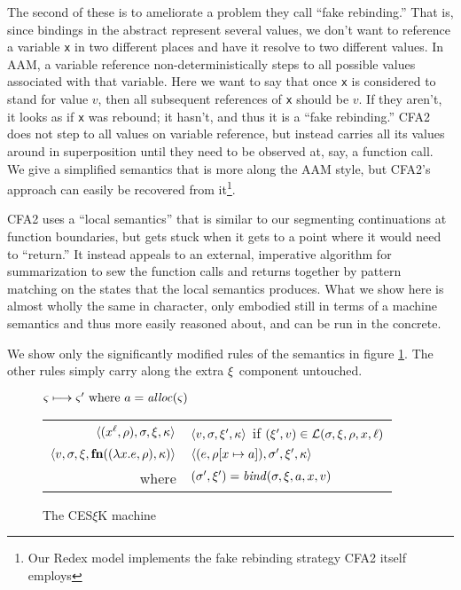 \documentclass{llncs}
\begin{document}
The second of these is to ameliorate a problem they call ``fake
rebinding.'' That is, since bindings in the abstract represent several
values, we don't want to reference a variable \texttt{x} in two
different places and have it resolve to two different values. In AAM,
a variable reference non-deterministically steps to all possible
values associated with that variable. Here we want to say that once
\texttt{x} is considered to stand for value $v$, then all subsequent
references of \texttt{x} should be $v$. If they aren't, it looks as if
\texttt{x} was rebound; it hasn't, and thus it is a ``fake
rebinding.'' CFA2 does not step to all values on variable reference,
but instead carries all its values around in superposition until they
need to be observed at, say, a function call. We give a simplified
semantics that is more along the AAM style, but CFA2's approach can
easily be recovered from it\footnote{Our Redex model implements the
  fake rebinding strategy CFA2 itself employs}.

CFA2 uses a ``local semantics'' that is similar to our segmenting
continuations at function boundaries, but gets stuck when it gets to a
point where it would need to ``return.'' It instead appeals to an
external, imperative algorithm for summarization to sew the function
calls and returns together by pattern matching on the states that the
local semantics produces. What we show here is almost wholly the same
in character, only embodied still in terms of a machine semantics and
thus more easily reasoned about, and can be run in the concrete.

We show only the significantly modified rules of the semantics in
figure \ref{fig:frame-semantics}. The other rules simply carry along
the extra $\mframe$ component untouched.
\begin{figure}
  \centering
  $\mstate \stepto \mstate' \text{ where } \maddr = \alloc(\mstate)$ \\
  \begin{tabular}{r|l}
    \hline
    $\tpl{(\svar[\mlab]{\mvar}, \menv), \mstore, \mframe, \mkont}$
    &
    $\tpl{\mval,\mstore,\mframe',\mkont}$ if $(\mframe', \mval) \in \lookup(\mstore,\mframe,\menv,\mvar,\mlab)$
    \\
    $\tpl{\mval,\mstore,\mframe,\kfn{\vclo{\slam{\mvar}{\mexpr}}{\menv}, \mkont}}$
    &
    $\tpl{(\mexpr, \extm{\menv}{\mvar}{\maddr}), \mstore', \mframe', \mkont}$
    \\ where & $(\mstore',\mframe') = \bind(\mstore,\mframe,\maddr,\mvar,\mval)$
  \end{tabular}
  \caption{The CES$\xi$K machine}
  \label{fig:frame-semantics}
\end{figure}
\end{document}
